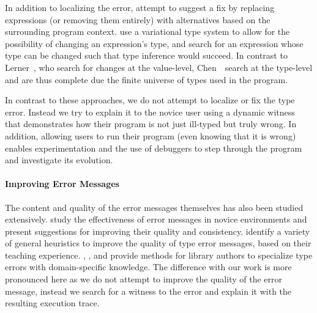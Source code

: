 In addition to localizing the error, \citet{Lerner2007-dt} attempt to
suggest a fix by replacing expressions (or removing them entirely) with
alternatives based on the surrounding program context.
%
\citet{Chen2014-gd} use a variational type system to allow for the
possibility of changing an expression's type, and search for an
expression whose type can be changed such that type inference would
succeed.
%
%
In contrast to Lerner~\etal, who search for changes at the value-level,
Chen~\etal\ search at the type-level and are thus complete due the finite
universe of types used in the program.
%
%

In contrast to these approaches, we do not attempt to localize or fix
the type error. Instead we try to explain it to the novice user using a
dynamic witness that demonstrates how their program is not just
ill-typed but truly wrong. In addition, allowing users to run their
program (even knowing that it is wrong) enables experimentation and the
use of debuggers to step through the program and investigate its
evolution.

\paragraph{Improving Error Messages}
The content and quality of the error messages themselves has also been
studied extensively.
%
\citet{Marceau2011-ok,Marceau2011-cy} study the effectiveness of error
messages in novice environments and present suggestions for improving
their quality and consistency.
%
\citet{Hage2006-hc} identify a variety of general heuristics to improve
the quality of type error messages, based on their teaching experience.
%
\citet{Heeren2003-db}, \citet{Christiansen2014-qc}, and
\citet{Serrano2016-oo} provide methods for library authors to specialize
type errors with domain-specific knowledge.
%
The difference with our work is more pronounced here as we do not
attempt to improve the quality of the error message, instead we search
for a witness to the error and explain it with the resulting execution
trace.

